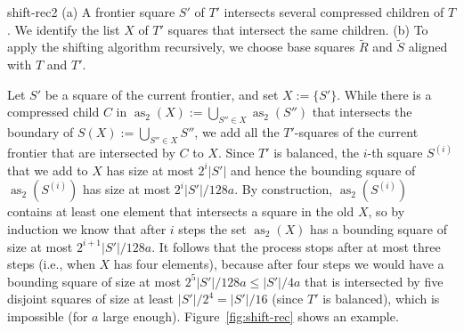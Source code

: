 \documentclass[11pt]{paper}
\newcommand {\eqdef} {:=}
\DeclareMathOperator {\as}{as}
\begin{document}
       {shift-rec2}
      { (a) A frontier square $S'$ of $T'$ intersects several compressed children of $T$. We identify the list $X$ of $T'$ squares that intersect the same children.
        (b) To apply the shifting algorithm recursively, we choose base squares $\tilde R$ and $\tilde S$ aligned with $T$ and $T'$.
      }
      
      Let $S'$ be a square of the current frontier, and set $X \eqdef \{S'\}$.
      While there is a compressed child $C$ in 
      $\as_2(X) \eqdef \bigcup_{S'' \in X} \as_2(S'')$ that intersects 
      the boundary of 
      $S(X) \eqdef \bigcup_{S'' \in X} S''$, we add all the $T'$-squares 
      of the current frontier
      that are intersected by $C$ to $X$.  Since $T'$ is balanced, the 
      $i$-th square $S^{(i)}$ that we add to $X$ has size at most $2^i|S'|$ and
      hence the bounding square of $\as_2(S^{(i)})$  has size at most 
      $2^i|S'|/128a$. By construction, $\as_2(S^{(i)})$ contains at least
      one element that intersects a square in the old $X$, so by induction
      we know that after $i$ steps the set
      $\as_2(X)$ has a bounding square of size at most
      $2^{i+1}|S'|/128a$. It follows that the process stops after at most
      three steps (i.e., when $X$ has four elements), because after
      four steps we would have a bounding square of size at most 
      $2^5|S'|/128a \leq |S'|/4a$
      that is intersected by five disjoint squares of size at least 
      $|S'|/2^4 = |S'|/16$ (since 
      $T'$ is balanced), which is impossible (for $a$ large enough).
      Figure~\ref {fig:shift-rec} shows an example.
\end{document}
